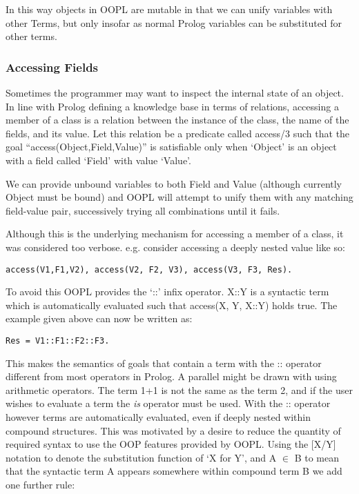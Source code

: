 \documentclass[12pt,a4paper,twoside,openright]{report}
\begin{document}
In this way objects in OOPL are mutable in that we can unify variables with other Terms, but only insofar as normal Prolog variables can be substituted for other terms. 

\subsubsection{Accessing Fields}

Sometimes the programmer may want to inspect the internal state of an object. In line with Prolog defining a knowledge base in terms of relations, accessing a member of a class is a relation between the instance of the class, the name of the fields, and its value. Let this relation be a predicate called access/3 such that the goal ``access(Object,Field,Value)'' is satisfiable only when `Object' is an object with a field called `Field' with value `Value'.

\bigskip

We can provide unbound variables to both Field and Value (although currently Object must be bound) and OOPL will attempt to unify them with any matching field-value pair, successively trying all combinations until it fails. 

\bigskip
Although this is the underlying mechanism for accessing a member of a class, it was considered too verbose. e.g. consider accessing a deeply nested value like so: 
\begin{lstlisting}
access(V1,F1,V2), access(V2, F2, V3), access(V3, F3, Res).
\end{lstlisting}
To avoid this OOPL provides the `::' infix operator. X::Y is a syntactic term which is automatically evaluated such that access(X, Y, X::Y) holds true. The example given above can now be written as:
\begin{lstlisting}
Res = V1::F1::F2::F3.
\end{lstlisting}

\bigskip

This makes the semantics of goals that contain a term with the :: operator different from most operators in Prolog. A parallel might be drawn with using arithmetic operators. The term 1+1 is not the same as the term 2, and if the user wishes to evaluate a term the \emph{is} operator must be used. With the :: operator however terms are automatically evaluated, even if deeply nested within compound structures. This was motivated by a desire to reduce the quantity of required syntax to use the OOP features provided by OOPL. Using the [X/Y] notation to denote the substitution function of `X for Y', and A $\in$ B to mean that the syntactic term A appears somewhere within compound term B we add one further rule:
\end{document}
